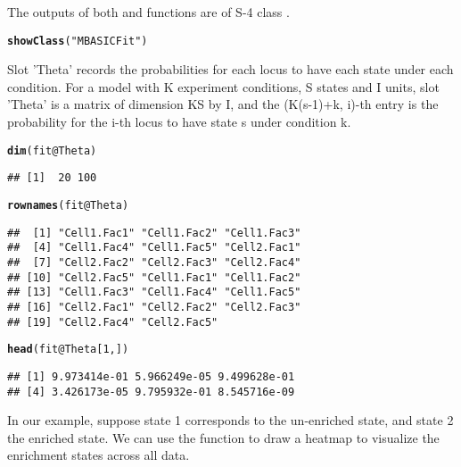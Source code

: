 \documentclass[a4paper,10pt]{article}\usepackage[]{graphicx}\usepackage[]{color}
\makeatletter
\newcommand{\hlnum}[1]{\textcolor[rgb]{0.686,0.059,0.569}{#1}}%
\newcommand{\hlstr}[1]{\textcolor[rgb]{0.192,0.494,0.8}{#1}}%
\newcommand{\hlopt}[1]{\textcolor[rgb]{0,0,0}{#1}}%
\newcommand{\hlstd}[1]{\textcolor[rgb]{0.345,0.345,0.345}{#1}}%
\newcommand{\hlkwc}[1]{\textcolor[rgb]{0.333,0.667,0.333}{#1}}%
\newcommand{\hlkwd}[1]{\textcolor[rgb]{0.737,0.353,0.396}{\textbf{#1}}}%
\newenvironment{kframe}{%
 \def\at@end@of@kframe{}%
 \ifinner\ifhmode%
  \def\at@end@of@kframe{\end{minipage}}%
  \begin{minipage}{\columnwidth}%
 \fi\fi%
 \def\FrameCommand##1{\hskip\@totalleftmargin \hskip-\fboxsep
 \colorbox{shadecolor}{##1}\hskip-\fboxsep
     \hskip-\linewidth \hskip-\@totalleftmargin \hskip\columnwidth}%
 \MakeFramed {\advance\hsize-\width
   \@totalleftmargin\z@ \linewidth\hsize
   \@setminipage}}%
 {\par\unskip\endMakeFramed%
 \at@end@of@kframe}
\newenvironment{knitrout}{}{} %
\makeatother
\begin{document}
The outputs of both  and  functions are of S-4 class .

\begin{knitrout}
\color{fgcolor}\begin{kframe}
\begin{alltt}
\hlkwd{showClass}\hlstd{(}\hlstr{"MBASICFit"}\hlstd{)}
\end{alltt}
\end{kframe}
\end{knitrout}

Slot 'Theta' records the probabilities for each locus to have each state under each condition. For a model with K experiment conditions, S states and I units, slot 'Theta' is a matrix of dimension KS by I, and the (K(s-1)+k, i)-th entry is the probability for the i-th locus to have state s under condition k. 

\begin{knitrout}
\color{fgcolor}\begin{kframe}
\begin{alltt}
\hlkwd{dim}\hlstd{(fit}\hlopt{@}\hlkwc{Theta}\hlstd{)}
\end{alltt}
\begin{verbatim}
## [1]  20 100
\end{verbatim}
\begin{alltt}
\hlkwd{rownames}\hlstd{(fit}\hlopt{@}\hlkwc{Theta}\hlstd{)}
\end{alltt}
\begin{verbatim}
##  [1] "Cell1.Fac1" "Cell1.Fac2" "Cell1.Fac3"
##  [4] "Cell1.Fac4" "Cell1.Fac5" "Cell2.Fac1"
##  [7] "Cell2.Fac2" "Cell2.Fac3" "Cell2.Fac4"
## [10] "Cell2.Fac5" "Cell1.Fac1" "Cell1.Fac2"
## [13] "Cell1.Fac3" "Cell1.Fac4" "Cell1.Fac5"
## [16] "Cell2.Fac1" "Cell2.Fac2" "Cell2.Fac3"
## [19] "Cell2.Fac4" "Cell2.Fac5"
\end{verbatim}
\begin{alltt}
\hlkwd{head}\hlstd{(fit}\hlopt{@}\hlkwc{Theta}\hlstd{[}\hlnum{1}\hlstd{, ])}
\end{alltt}
\begin{verbatim}
## [1] 9.973414e-01 5.966249e-05 9.499628e-01
## [4] 3.426173e-05 9.795932e-01 8.545716e-09
\end{verbatim}
\end{kframe}
\end{knitrout}

In our example, suppose state 1 corresponds to the un-enriched state, and state 2 the enriched state. We can use the function  to draw a heatmap to visualize the enrichment states across all data.
\end{document}

